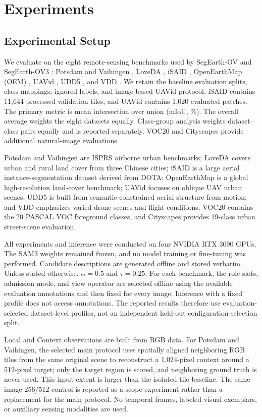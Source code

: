 \section{Experiments}
\label{sec:experiments}

\subsection{Experimental Setup}

We evaluate on the eight remote-sensing benchmarks used by SegEarth-OV and SegEarth-OV3 \cite{R06,R11}: Potsdam and Vaihingen \cite{R42}, LoveDA \cite{R36}, iSAID \cite{R37}, OpenEarthMap (OEM) \cite{R38}, UAVid \cite{R39}, UDD5 \cite{R40}, and VDD \cite{R41}. We retain the baseline evaluation splits, class mappings, ignored labels, and image-based UAVid protocol. iSAID contains 11,644 processed validation tiles, and UAVid contains 1,020 evaluated patches. The primary metric is mean intersection over union (mIoU, \%). The overall average weights the eight datasets equally. Class-group analysis weights dataset--class pairs equally and is reported separately. VOC20 \cite{R44} and Cityscapes \cite{R43} provide additional natural-image evaluations.

Potsdam and Vaihingen are ISPRS airborne urban benchmarks; LoveDA covers urban and rural land cover from three Chinese cities; iSAID is a large aerial instance-segmentation dataset derived from DOTA; OpenEarthMap is a global high-resolution land-cover benchmark; UAVid focuses on oblique UAV urban scenes; UDD5 is built from semantic-constrained aerial structure-from-motion; and VDD emphasizes varied drone scenes and flight conditions. VOC20 contains the 20 PASCAL VOC foreground classes, and Cityscapes provides 19-class urban street-scene evaluation.

All experiments and inference were conducted on four NVIDIA RTX 3090 GPUs. The SAM3 weights remained frozen, and no model training or fine-tuning was performed. Candidate descriptions are generated offline and stored verbatim. Unless stated otherwise, $\alpha=0.5$ and $\tau=0.25$. For each benchmark, the role slots, admission mode, and view operator are selected offline using the available evaluation annotations and then fixed for every image. Inference with a fixed profile does not access annotations. The reported results therefore use evaluation-selected dataset-level profiles, not an independent held-out configuration-selection split.

Local and Context observations are built from RGB data. For Potsdam and Vaihingen, the selected main protocol uses spatially aligned neighboring RGB tiles from the same original scene to reconstruct a 1,024-pixel context around a 512-pixel target; only the target region is scored, and neighboring ground truth is never used. This input extent is larger than the isolated-tile baseline. The same-image 256/512 control is reported as a scope experiment rather than a replacement for the main protocol. No temporal frames, labeled visual exemplars, or auxiliary sensing modalities are used.

